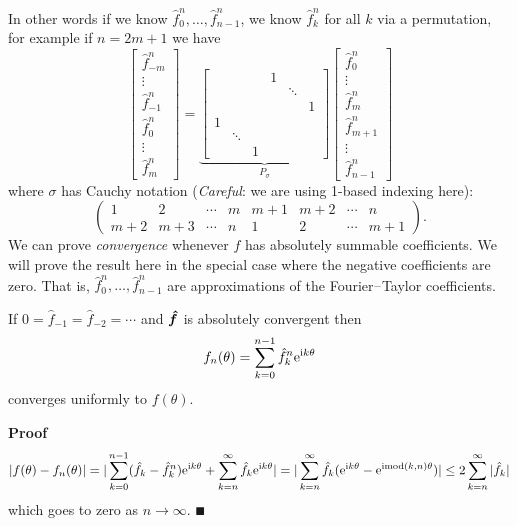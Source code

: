 In other words if we know $\hat f_0^n, \ensuremath{\ldots}, \hat f_{n-1}^n$, we know $\hat f_k^n$ for all $k$ via a permutation, for example if $n = 2m+1$ we have
\[
\begin{bmatrix}
\hat f_{-m}^n \\
\ensuremath{\vdots}\\
\hat f_{-1}^n \\
\hat f_0^n \\
\ensuremath{\vdots}\\
\hat f_m^n
\end{bmatrix} = \underbrace{\begin{bmatrix} &&& 1 \\ &&&& \ensuremath{\ddots} \\ &&&&& 1 \\
    1 \\ & \ensuremath{\ddots} \\ && 1 \end{bmatrix}}_{P_\ensuremath{\sigma}}
\begin{bmatrix}
\hat f_0^n \\
\ensuremath{\vdots}\\
\hat f_m^n\\
\hat f_{m+1}^n \\
\ensuremath{\vdots}\\
\hat f_{n-1}^n
\end{bmatrix}
\]
where $\ensuremath{\sigma}$ has Cauchy notation (\emph{Careful}: we are using 1-based indexing here):
\[
\begin{pmatrix}
1 & 2 & \ensuremath{\cdots} & m & m+1 & m+2 & \ensuremath{\cdots} & n  \\
m+2 & m+3 & \ensuremath{\cdots} & n & 1 & 2 & \ensuremath{\cdots} & m+1
\end{pmatrix}.
\]
We can  prove \emph{convergence} whenever $f$ has absolutely summable coefficients. We will prove the result here in the special case where the negative coefficients are zero. That is, $\hat f_0^n, \ensuremath{\ldots}, \hat f_{n-1}^n$ are approximations of the Fourier\ensuremath{\endash}Taylor coefficients.

\begin{theorem} If $0 = \hat f_{-1} = \hat f_{-2} = \ensuremath{\cdots}$ and ${\mbox{\boldmath$\hat f$\unboldmath}}$ is absolutely convergent then
\[
f_n(\theta) = \sum_{k=0}^{n-1} \hat f_k^n {\rm e}^{{\rm i} k \theta}
\]
converges uniformly to $f(\ensuremath{\theta})$.

\end{theorem}
\textbf{Proof}
\begin{align*}
|f(\theta) - f_n(\theta)| = |\sum_{k=0}^{n-1} (\hat f_k - \hat f_k^n) {\rm e}^{{\rm i} k \theta} + \sum_{k=n}^\infty \hat f_k {\rm e}^{{\rm i} k \theta}|
= |\sum_{k=n}^\infty \hat f_k ({\rm e}^{{\rm i} k \theta} - {\rm e}^{{\rm i} {\rm mod}(k,n) \theta})|
\leq 2 \sum_{k=n}^\infty |\hat f_k|
\end{align*}
which goes to zero as $n \ensuremath{\rightarrow} \ensuremath{\infty}$. \ensuremath{\QED}

